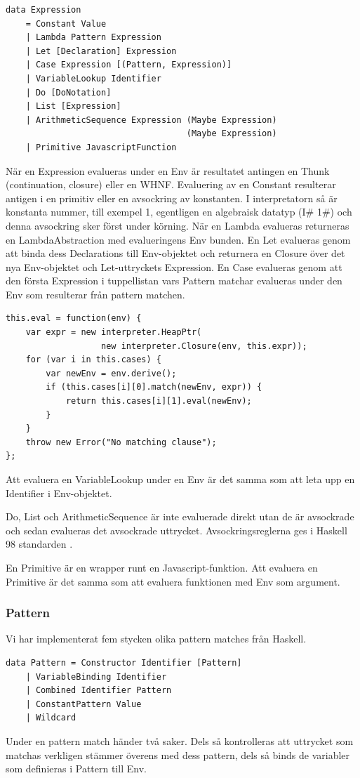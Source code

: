 \begin{lstlisting}
data Expression 
    = Constant Value
    | Lambda Pattern Expression
    | Let [Declaration] Expression
    | Case Expression [(Pattern, Expression)]
    | VariableLookup Identifier
    | Do [DoNotation]
    | List [Expression]
    | ArithmeticSequence Expression (Maybe Expression) 
                                    (Maybe Expression)
    | Primitive JavascriptFunction
\end{lstlisting}

När en Expression evalueras under en Env är resultatet antingen en Thunk (continuation, closure) eller en WHNF. Evaluering av en Constant resulterar antigen i en primitiv eller en avsockring av konstanten. I interpretatorn så är konstanta nummer, till exempel 1, egentligen en algebraisk datatyp (I\# 1\#) och denna avsockring sker först under körning. När en Lambda evalueras returneras en LambdaAbstraction med evalueringens Env bunden. En Let evalueras genom att binda dess Declarations till Env-objektet och returnera en Closure över det nya Env-objektet och Let-uttryckets Expression. En Case evalueras genom att den första Expression i tuppellistan vars Pattern matchar evalueras under den Env som resulterar från pattern matchen.
\begin{lstlisting}
this.eval = function(env) {
    var expr = new interpreter.HeapPtr(
                   new interpreter.Closure(env, this.expr));
    for (var i in this.cases) {
        var newEnv = env.derive();
        if (this.cases[i][0].match(newEnv, expr)) {
            return this.cases[i][1].eval(newEnv);
        }
    }
    throw new Error("No matching clause");
};
\end{lstlisting}
Att evaluera en VariableLookup under en Env är det samma som att leta upp en Identifier i Env-objektet.

Do, List och ArithmeticSequence är inte evaluerade direkt utan de är avsockrade och sedan evalueras det avsockrade uttrycket. Avsockringsreglerna ges i Haskell 98 standarden \citep{haskell98chap3}.

En Primitive är en wrapper runt en Javascript-funktion. Att evaluera en Primitive är det samma som att evaluera funktionen med Env som argument.

\subsubsection{Pattern}
Vi har implementerat fem stycken olika pattern matches från Haskell.
\begin{lstlisting}
data Pattern = Constructor Identifier [Pattern]
    | VariableBinding Identifier
    | Combined Identifier Pattern
    | ConstantPattern Value
    | Wildcard
\end{lstlisting}
Under en pattern match händer två saker. Dels så kontrolleras att uttrycket som matchas verkligen stämmer överens med dess pattern, dels så binds de variabler som definieras i Pattern till Env. 

